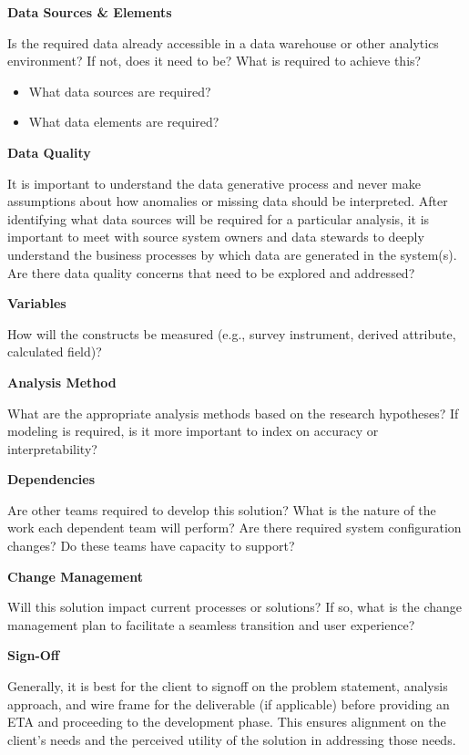 \documentclass[]{book}
\providecommand{\tightlist}{%
  \setlength{\itemsep}{0pt}\setlength{\parskip}{0pt}}
\begin{document}
\textbf{Data Sources \& Elements}

Is the required data already accessible in a data warehouse or other analytics environment? If not, does it need to be? What is required to achieve this?

\begin{itemize}
\tightlist
\item
  What data sources are required?
\item
  What data elements are required?
\end{itemize}

\textbf{Data Quality}

It is important to understand the data generative process and never make assumptions about how anomalies or missing data should be interpreted. After identifying what data sources will be required for a particular analysis, it is important to meet with source system owners and data stewards to deeply understand the business processes by which data are generated in the system(s). Are there data quality concerns that need to be explored and addressed?

\textbf{Variables}

How will the constructs be measured (e.g., survey instrument, derived attribute, calculated field)?

\textbf{Analysis Method}

What are the appropriate analysis methods based on the research hypotheses? If modeling is required, is it more important to index on accuracy or interpretability?

\textbf{Dependencies}

Are other teams required to develop this solution? What is the nature of the work each dependent team will perform? Are there required system configuration changes? Do these teams have capacity to support?

\textbf{Change Management}

Will this solution impact current processes or solutions? If so, what is the change management plan to facilitate a seamless transition and user experience?

\textbf{Sign-Off}

Generally, it is best for the client to signoff on the problem statement, analysis approach, and wire frame for the deliverable (if applicable) before providing an ETA and proceeding to the development phase. This ensures alignment on the client's needs and the perceived utility of the solution in addressing those needs.
\end{document}
